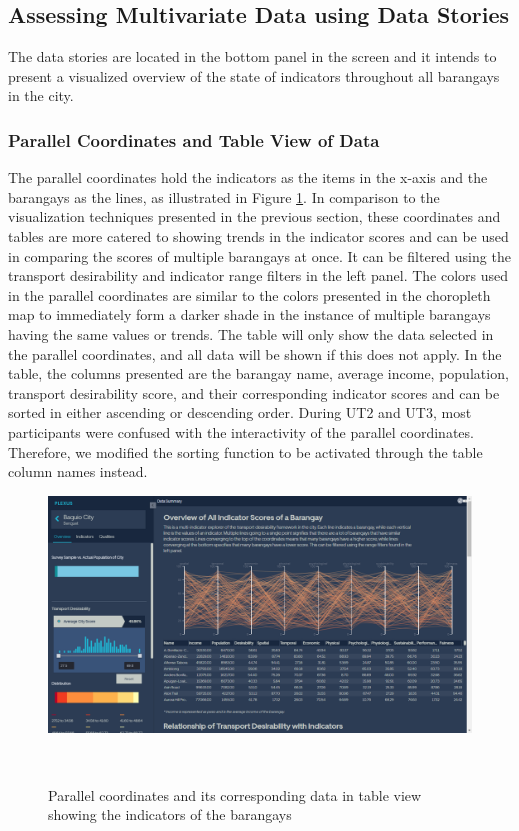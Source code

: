 \documentclass{sigchi}
\begin{document}
\subsection{Assessing Multivariate Data using Data Stories}
The data stories are located in the bottom panel in the screen and it intends to present a visualized overview of the state of indicators throughout all barangays in the city.

\subsubsection{Parallel Coordinates and Table View of Data}
The parallel coordinates hold the indicators as the items in the x-axis and the barangays as the lines, as illustrated in Figure \ref{fig:KeplerParallelCoords}. In comparison to the visualization techniques presented in the previous section, these coordinates and tables are more catered to showing trends in the indicator scores and can be used in comparing the scores of multiple barangays at once. It can be filtered using the transport desirability and indicator range filters in the left panel. The colors used in the parallel coordinates are similar to the colors presented in the choropleth map to immediately form a darker shade in the instance of multiple barangays having the same values or trends. The table will only show the data selected in the parallel coordinates, and all data will be shown if this does not apply. In the table, the columns presented are the barangay name, average income, population, transport desirability score, and their corresponding indicator scores and can be sorted in either ascending or descending order. During UT2 and UT3, most participants were confused with the interactivity of the parallel coordinates. Therefore, we modified the sorting function to be activated through the table column names instead.

\begin{figure}
\centering
  \includegraphics[width=0.9\columnwidth]{figures/overview-dsum.PNG}
  \caption{Parallel coordinates and its corresponding data in table view showing the indicators of the barangays}~\label{fig:KeplerParallelCoords}
\end{figure}
\end{document}
